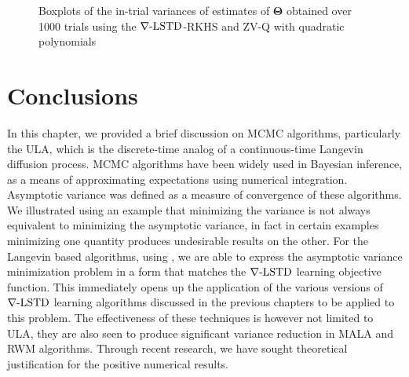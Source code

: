 \begin{figure}[htbp]
{		 
	} 
\caption{Boxplots of the in-trial variances of estimates of $\boldsymbol{\Theta}$ obtained over 1000 trials using the $\nabla\text{-LSTD}$-RKHS and ZV-Q with quadratic polynomials}
\label{fig:mcmc_box_var_Theta}
\end{figure}

\section{Conclusions}
In this chapter, we provided a brief discussion on MCMC algorithms, particularly the ULA, which is the discrete-time analog of a continuous-time Langevin diffusion process. MCMC algorithms have been widely used in Bayesian inference, as a means of approximating expectations using numerical integration. Asymptotic variance was defined as a measure of convergence of these algorithms. We illustrated using an example that minimizing the variance is not always equivalent to minimizing the asymptotic variance, in fact in certain examples minimizing one quantity produces undesirable results on the other. For the Langevin based algorithms, using , we are able to express the asymptotic variance minimization problem in a form that matches the $\nabla\text{-LSTD}$ learning objective function. This immediately opens up the application of the various versions of $\nabla\text{-LSTD}$ learning algorithms discussed in the previous chapters to be applied to this problem. The effectiveness of these techniques is however not limited to ULA, they are also seen to produce significant variance reduction in MALA and RWM algorithms. Through recent research, we have sought theoretical justification for the positive numerical results.  

